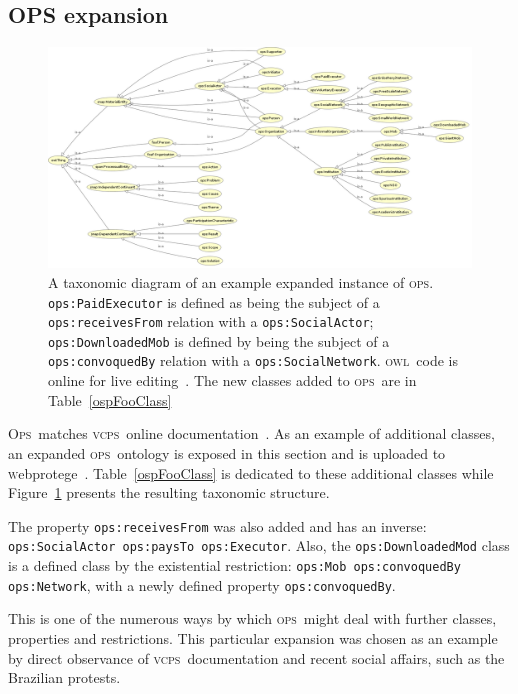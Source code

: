 \documentclass[10pt,letterpaper]{article}
\newcommand{\ops}{\textsc{ops}}
\newcommand{\opsi}{O\textsc{ps}}
\newcommand{\vcps}{\textsc{vcps}}
\newcommand{\owl}{\textsc{owl}}
\newcommand{\webprotege}{\textsc{w}ebprotege}
\begin{document}
\subsection{OPS expansion}\label{downwards}

\begin{figure}
    \vspace{24.5em}
    \hspace*{-3.5em}
        \includegraphics[width=1.05\textwidth]{figs/opsExpandedTax}
        \caption{A taxonomic diagram of an example expanded instance of \ops. {\tt ops:PaidExecutor} is defined as being the subject of a \texttt{ops:receivesFrom} relation with a \texttt{ops:SocialActor}; \texttt{ops:DownloadedMob} is defined by being the subject of a \texttt{ops:convoquedBy} relation with a \texttt{ops:SocialNetwork}. \owl\ code is online for live editing~\cite{owlExp}. The new classes added to \ops\ are in Table~\ref{ospFooClass}}
    \label{fig:owlExp}
\end{figure}

\opsi\ matches \vcps\ online documentation~\cite{corais}. As an example of additional classes, an expanded \ops\ ontology is exposed in this section and is uploaded to \webprotege~\cite{owlExp}. Table~\ref{ospFooClass} is dedicated to these additional classes while Figure~\ref{fig:owlExp} presents the resulting taxonomic structure.

The property {\tt ops:receivesFrom} was also added and has an inverse: \texttt{ops:SocialActor ops:paysTo ops:Executor}. Also, the {\tt ops:DownloadedMod} class is a defined class by the existential restriction: \texttt{ops:Mob ops:convoquedBy ops:Network}, with a newly defined property \texttt{ops:convoquedBy}.

This is one of the numerous ways by which \ops\ might deal with further classes, properties and restrictions. This particular expansion was chosen as an example by direct observance of \vcps\ documentation and recent social affairs, such as the Brazilian protests.
\end{document}
